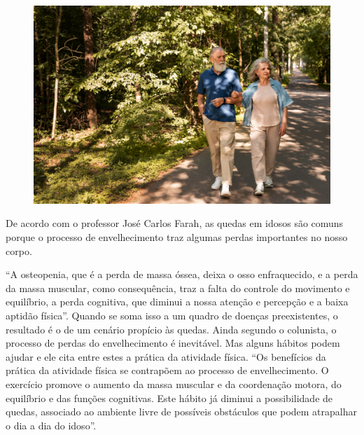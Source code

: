 \begin{myquote}

\begin{figure}[H]
\centering
\includegraphics[scale=0.3]{./imgSAEB_7_POR/media/image31.png}
\end{figure}

De acordo com o professor José Carlos Farah, as quedas em idosos são comuns
porque o processo de envelhecimento traz algumas perdas importantes no nosso
corpo.

``A osteopenia, que é a perda de massa óssea, deixa o osso enfraquecido, e a
perda da massa muscular, como consequência, traz a falta do controle do
movimento e equilíbrio, a perda cognitiva, que diminui a nossa atenção e
percepção e a baixa aptidão física''. Quando se soma isso a um quadro de
doenças preexistentes, o resultado é o de um cenário propício às quedas. Ainda
segundo o colunista, o processo de perdas do envelhecimento é inevitável. Mas
alguns hábitos podem ajudar e ele cita entre estes a prática da atividade
física. ``Os benefícios da prática da atividade física se contrapõem ao
processo de envelhecimento. O exercício promove o aumento da massa muscular e
da coordenação motora, do equilíbrio e das funções cognitivas. Este hábito já
diminui a possibilidade de quedas, associado ao ambiente livre de possíveis
obstáculos que podem atrapalhar o dia a dia do idoso''.

\end{myquote}


